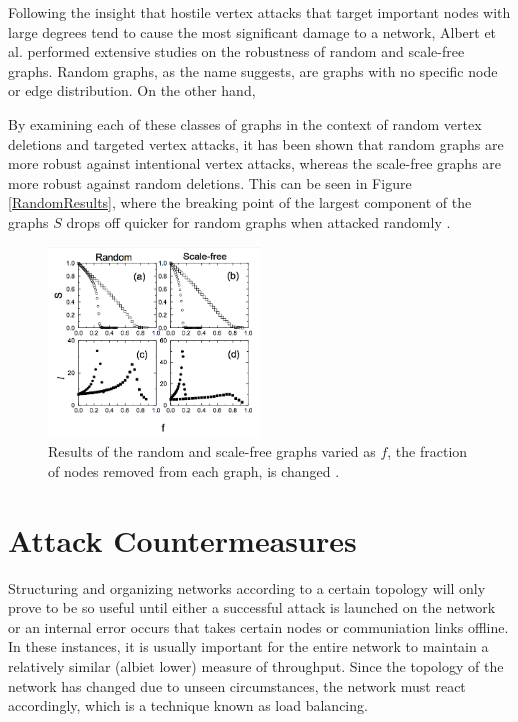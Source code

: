 \documentclass[11pt]{article}
\begin{document}

Following the insight that hostile vertex attacks that target important nodes with large degrees tend to cause the most significant damage to a network, Albert et al. performed extensive studies on the robustness of random and scale-free graphs. Random graphs, as the name suggests, are graphs with no specific node or edge distribution. On the other hand, 


By examining each of these classes of graphs in the context of random vertex deletions and targeted vertex attacks, it has been shown that random graphs are more robust against intentional vertex attacks, whereas the scale-free graphs are more robust against random deletions. This can be seen in Figure \ref{RandomResults}, where the breaking point of the largest component of the graphs $S$ drops off quicker for random graphs when attacked randomly \cite{GraphThesis}. 

\begin{figure}[h!]
	\label{fig:RandomResults}
	\centering
		\includegraphics[width=0.5\textwidth]{random_results.png}
	\caption{Results of the random and scale-free graphs varied as $f$, the fraction of nodes removed from each graph, is changed \cite{GraphThesis}. }
\end{figure}


\section{Attack Countermeasures}
Structuring and organizing networks according to a certain topology will only prove to be so useful until either a successful attack is launched on the network or an internal error occurs that takes certain nodes or communiation links offline. In these instances, it is usually important for the entire network to maintain a relatively similar (albiet lower) measure of throughput. Since the topology of the network has changed due to unseen circumstances, the network must react accordingly, which is a technique known as load balancing. 
\end{document}
